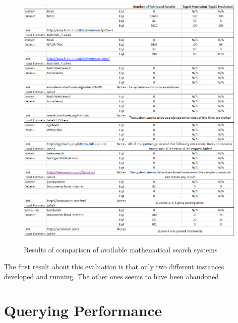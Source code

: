 \begin{figure}
\includegraphics[height=15 cm]{figures/comparison_table.png}
\label{comparison_sw_table}
\caption{Results of comparison of available mathematical search systems}
\end{figure}

The first result about this evaluation is that only two different instances developed and running. The other ones seems to have been abandoned.

\section{Querying Performance}

